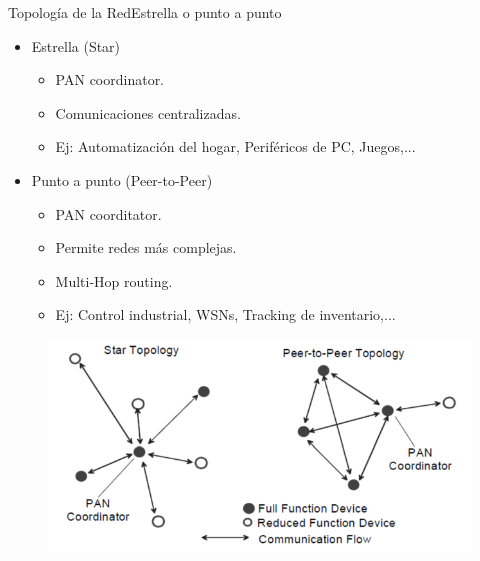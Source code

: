 \documentclass[aspectratio=169]{beamer}
\begin{document}
\begin{frame}{Topología de la Red}{Estrella o punto a punto}

\begin{minipage}[c]{1.0\linewidth}
	\begin{minipage}[c]{0.45\linewidth}
		\begin{itemize}
			\item Estrella (Star)
			\begin{itemize}
				\item PAN coordinator.
				\item Comunicaciones centralizadas.
				\item Ej: Automatización del hogar, Periféricos de PC, Juegos,...
					\end{itemize}
			\vspace{10px}
			\item Punto a punto (Peer-to-Peer)
			\begin{itemize}
				\item PAN coorditator.
				\item Permite redes más complejas.
				\item Multi-Hop routing.
				\item Ej: Control industrial,  WSNs, Tracking de inventario,...
			\end{itemize}
	  	\end{itemize}	
	\end{minipage}
	\hspace{-20px}
	\begin{minipage}[c]{0.7\linewidth}
		\begin{figure}[H]
			{\includegraphics[width=.7\textwidth]{./imagenes/Topology}}
		\end{figure}	  	  	
	\end{minipage}
\end{minipage}
\end{frame}
\end{document}
